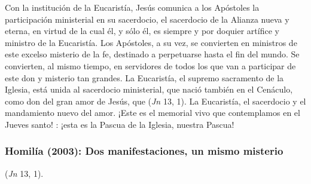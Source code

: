 \begin{body}
Con la institución de la Eucaristía, Jesús comunica a los Apóstoles la participación ministerial en su sacerdocio, el sacerdocio de la Alianza nueva y eterna, en virtud de la cual él, y sólo él, es siempre y por doquier artífice y ministro de la Eucaristía. Los Apóstoles, a su vez, se convierten en ministros de este excelso misterio de la fe, destinado a perpetuarse hasta el fin del mundo. Se convierten, al mismo tiempo, en servidores de todos los que van a participar de este don y misterio tan grandes. La Eucaristía, el supremo sacramento de la Iglesia, está unida al sacerdocio ministerial, que nació también en el Cenáculo, como don del gran amor de Jesús, que  (\textit{Jn} 13, 1). La Eucaristía, el sacerdocio y el mandamiento nuevo del amor. ¡Este es el memorial vivo que contemplamos en el Jueves santo! : ¡esta es la Pascua de la Iglesia, nuestra Pascua!
\end{body}


\subsubsection{Homilía (2003): Dos manifestaciones, un mismo misterio}


 (\textit{Jn} 13, 1).

